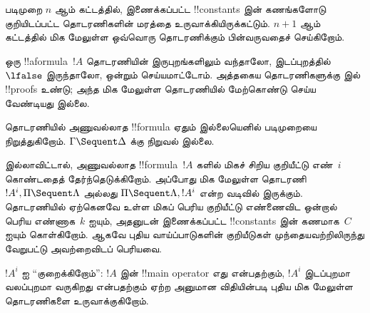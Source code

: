\documentclass[../../../include/open-logic-section]{subfiles}
\begin{document}
படிமுறை $n$ ஆம் கட்டத்தில், இணைக்கப்பட்ட
!!{constant}s இன் கணங்களோடு குறியிடப்பட்ட
தொடரணிகளின் மரத்தை உருவாக்கியிருக்கட்டும்.
$n+1$ ஆம் கட்டத்தில் மிக மேலுள்ள ஒவ்வொரு
தொடரணிக்கும் பின்வருவதைச் செய்கிறோம்.

ஒரு !!a{formula}~$!A$ தொடரணியின் இருபுறங்களிலும்
வந்தாலோ, இடப்புறத்தில்~$\lfalse$ இருந்தாலோ,
ஒன்றும் செய்யமாட்டோம். அத்தகைய தொடரணிகளுக்கு
 இல் !!{proof}s உண்டு; அந்த மிக மேலுள்ள
தொடரணியில் மேற்கொண்டு செய்ய வேண்டியது இல்லை.

தொடரணியில் அணுவல்லாத !!{formula} ஏதும்
இல்லையெனில் படிமுறையை நிறுத்துகிறோம்.
$\Gamma \Sequent \Delta$ க்கு நிறுவல் இல்லை.

இல்லாவிட்டால், அணுவல்லாத !!{formula}~$!A$
களில் மிகச் சிறிய குறியீட்டு எண்~$i$ கொண்டதைத்
தேர்ந்தெடுக்கிறோம். அப்போது மிக மேலுள்ள தொடரணி
$!A^i, \Pi \Sequent \Lambda$ அல்லது
$\Pi \Sequent \Lambda, !A^i$ என்ற வடிவில்
இருக்கும். தொடரணியில் ஏற்கெனவே உள்ள மிகப் பெரிய
குறியீட்டு எண்ணைவிட ஒன்றால் பெரிய எண்ணாக~$k$
ஐயும், அதனுடன் இணைக்கப்பட்ட !!{constant}s இன்
கணமாக~$C$ ஐயும் கொள்கிறோம். ஆகவே புதிய
வாய்ப்பாடுகளின் குறியீடுகள் முந்தையவற்றிலிருந்து
வேறுபட்டு அவற்றைவிடப் பெரியவை.

$!A^i$ ஐ ``குறைக்கிறோம்'': $!A$ இன்
!!{main operator} எது என்பதற்கும், $!A^i$
இடப்புறமா வலப்புறமா வருகிறது என்பதற்கும்
ஏற்ற அனுமான விதியின்படி புதிய மிக மேலுள்ள
தொடரணிகளை உருவாக்குகிறோம்.
\end{document}
